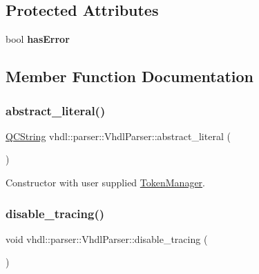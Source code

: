 \subsection*{Protected Attributes}
\begin{DoxyCompactItemize}
\item 
\mbox{\label{classvhdl_1_1parser_1_1_vhdl_parser_aac6ac9fa8a1f5193b7cad0ecc6ec9201}} 
bool {\bfseries has\+Error}
\end{DoxyCompactItemize}


\subsection{Member Function Documentation}
\mbox{\label{classvhdl_1_1parser_1_1_vhdl_parser_a8a8836b10b1fa8e14fc1cbd4a0bcd83f}} 
\subsubsection{\texorpdfstring{abstract\_literal()}{abstract\_literal()}}
{\footnotesize\ttfamily \mbox{\hyperlink{class_q_c_string}{Q\+C\+String}} vhdl\+::parser\+::\+Vhdl\+Parser\+::abstract\+\_\+literal (\begin{DoxyParamCaption}{ }\end{DoxyParamCaption})}

Constructor with user supplied \mbox{\hyperlink{classvhdl_1_1parser_1_1_token_manager}{Token\+Manager}}. \mbox{\label{classvhdl_1_1parser_1_1_vhdl_parser_ac370ca49c25acd71e91172656f8d6924}} 
\subsubsection{\texorpdfstring{disable\_tracing()}{disable\_tracing()}}
{\footnotesize\ttfamily void vhdl\+::parser\+::\+Vhdl\+Parser\+::disable\+\_\+tracing (\begin{DoxyParamCaption}{ }\end{DoxyParamCaption})}

